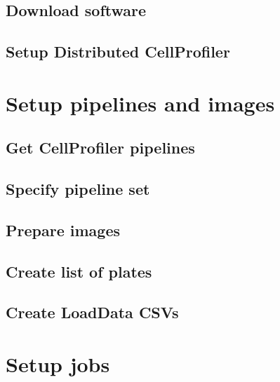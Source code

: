 \documentclass[]{book}
\begin{document}
\hypertarget{download-software}{%
\section{Download software}\label{download-software}}

\hypertarget{setup-distributed-cellprofiler}{%
\section{Setup Distributed
CellProfiler}\label{setup-distributed-cellprofiler}}

\hypertarget{setup-pipelines-and-images}{%
\chapter{Setup pipelines and images}\label{setup-pipelines-and-images}}

\hypertarget{get-cellprofiler-pipelines}{%
\section{Get CellProfiler pipelines}\label{get-cellprofiler-pipelines}}

\hypertarget{specify-pipeline-set}{%
\section{Specify pipeline set}\label{specify-pipeline-set}}

\hypertarget{prepare-images}{%
\section{Prepare images}\label{prepare-images}}

\hypertarget{create-list-of-plates}{%
\section{Create list of plates}\label{create-list-of-plates}}

\hypertarget{create-loaddata-csvs}{%
\section{Create LoadData CSVs}\label{create-loaddata-csvs}}

\hypertarget{setup-jobs}{%
\chapter{Setup jobs}\label{setup-jobs}}
\end{document}
